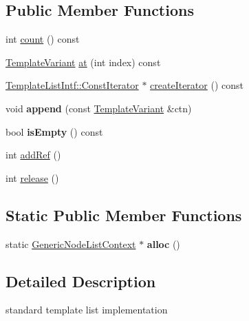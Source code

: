 \subsection*{Public Member Functions}
\begin{DoxyCompactItemize}
\item 
int \mbox{\hyperlink{class_generic_node_list_context_ab1bacca5f270077592153af9ea296ebe}{count}} () const
\item 
\mbox{\hyperlink{class_template_variant}{Template\+Variant}} \mbox{\hyperlink{class_generic_node_list_context_aa7d149964207236258937b46c4125cc7}{at}} (int index) const
\item 
\mbox{\hyperlink{class_template_list_intf_1_1_const_iterator}{Template\+List\+Intf\+::\+Const\+Iterator}} $\ast$ \mbox{\hyperlink{class_generic_node_list_context_a7a6253477c70ef96f84c74a685bc8fdf}{create\+Iterator}} () const
\item 
\mbox{\label{class_generic_node_list_context_a1e3defa7bc050ae33e2fbabba7a20643}} 
void {\bfseries append} (const \mbox{\hyperlink{class_template_variant}{Template\+Variant}} \&ctn)
\item 
\mbox{\label{class_generic_node_list_context_a2cf0a0ccee145f70657e1dc764627a10}} 
bool {\bfseries is\+Empty} () const
\item 
int \mbox{\hyperlink{class_generic_node_list_context_a8c165d6443a3f2522cd6a871ce45ebc4}{add\+Ref}} ()
\item 
int \mbox{\hyperlink{class_generic_node_list_context_a0aa1daa5e593ca8326d05a9028759750}{release}} ()
\end{DoxyCompactItemize}
\subsection*{Static Public Member Functions}
\begin{DoxyCompactItemize}
\item 
\mbox{\label{class_generic_node_list_context_a2784ae62d12218fae2007069afafbaec}} 
static \mbox{\hyperlink{class_generic_node_list_context}{Generic\+Node\+List\+Context}} $\ast$ {\bfseries alloc} ()
\end{DoxyCompactItemize}


\subsection{Detailed Description}
standard template list implementation 

